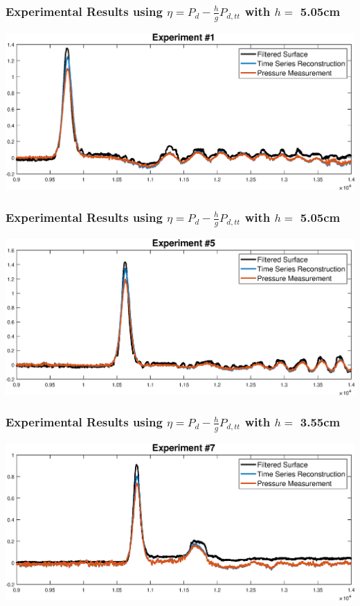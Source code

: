 \begin{frame}[t]\frametitle{Experimental Results using \(\eta = P_d - \frac{h}{g}P_{d,tt}\) with \(h = \) 5.05cm}
	\includegraphics[width=\textwidth]{images/Exp_num_1.eps}
\end{frame}

\begin{frame}[t]\frametitle{Experimental Results using \(\eta = P_d - \frac{h}{g}P_{d,tt}\) with \(h = \) 5.05cm}
	\includegraphics[width=\textwidth]{images/Exp_num_5.eps}
\end{frame}


\begin{frame}[t]\frametitle{Experimental Results using \(\eta = P_d - \frac{h}{g}P_{d,tt}\) with \(h = \) 3.55cm}
	\includegraphics[width=\textwidth]{images/Exp_num_7.eps}
\end{frame}

